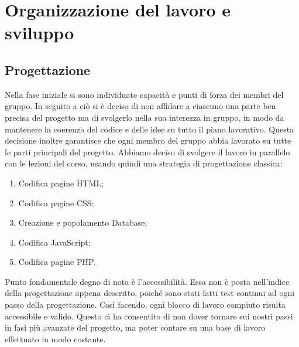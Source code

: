 \section{Organizzazione del lavoro e sviluppo}
\label{organizzazionelavoro}

\subsection{Progettazione}
Nella fase iniziale si sono individuate capacità e punti di forza dei membri del gruppo.
In seguito a ciò si è deciso di non affidare a ciascuno una parte ben precisa del progetto ma di svolgerlo nella sua interezza in gruppo, in modo da mantenere la coerenza del codice e delle idee su tutto il piano lavorativo.
Questa decisione inoltre garantisce che ogni membro del gruppo abbia lavorato su tutte le parti principali del progetto.
Abbiamo deciso di svolgere il lavoro in parallelo con le lezioni del corso, usando quindi una strategia di progettazione classica:
\begin{enumerate}
\item Codifica pagine HTML;
\item Codifica pagine CSS;
\item Creazione e popolamento Database;
\item Codifica JavaScript;
\item Codifica pagine PHP.
\end{enumerate}
Punto fondamentale degno di nota è l’accessibilità. Essa non è posta nell’indice della progettazione appena descritto, poiché sono stati fatti test continui ad ogni passo della progettazione.
Così facendo, ogni blocco di lavoro compiuto risulta accessibile e valido.
Questo ci ha consentito di non dover tornare sui nostri passi in fasi più avanzate del progetto, ma poter contare su una base di lavoro effettuato in modo costante.

